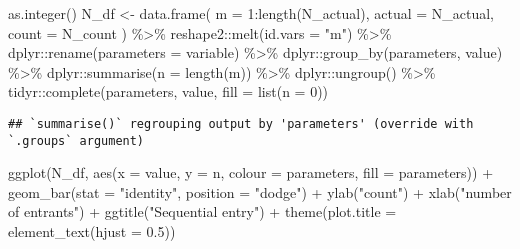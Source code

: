 \documentclass[
]{article}
\newenvironment{Shaded}{\begin{snugshade}}{\end{snugshade}}
\newcommand{\AttributeTok}[1]{\textcolor[rgb]{0.77,0.63,0.00}{#1}}
\newcommand{\DecValTok}[1]{\textcolor[rgb]{0.00,0.00,0.81}{#1}}
\newcommand{\FloatTok}[1]{\textcolor[rgb]{0.00,0.00,0.81}{#1}}
\newcommand{\FunctionTok}[1]{\textcolor[rgb]{0.00,0.00,0.00}{#1}}
\newcommand{\NormalTok}[1]{#1}
\newcommand{\OtherTok}[1]{\textcolor[rgb]{0.56,0.35,0.01}{#1}}
\newcommand{\SpecialCharTok}[1]{\textcolor[rgb]{0.00,0.00,0.00}{#1}}
\newcommand{\StringTok}[1]{\textcolor[rgb]{0.31,0.60,0.02}{#1}}
\begin{document}
\begin{Shaded}
\begin{Highlighting}[]
  \FunctionTok{as.integer}\NormalTok{()}
\NormalTok{N\_df }\OtherTok{\textless{}{-}} \FunctionTok{data.frame}\NormalTok{(}
  \AttributeTok{m =} \DecValTok{1}\SpecialCharTok{:}\FunctionTok{length}\NormalTok{(N\_actual),}
  \AttributeTok{actual =}\NormalTok{ N\_actual,}
  \AttributeTok{count =}\NormalTok{ N\_count}
\NormalTok{) }\SpecialCharTok{\%\textgreater{}\%}
\NormalTok{  reshape2}\SpecialCharTok{::}\FunctionTok{melt}\NormalTok{(}\AttributeTok{id.vars =} \StringTok{"m"}\NormalTok{) }\SpecialCharTok{\%\textgreater{}\%}
\NormalTok{  dplyr}\SpecialCharTok{::}\FunctionTok{rename}\NormalTok{(}\AttributeTok{parameters =}\NormalTok{ variable) }\SpecialCharTok{\%\textgreater{}\%}
\NormalTok{  dplyr}\SpecialCharTok{::}\FunctionTok{group\_by}\NormalTok{(parameters, value) }\SpecialCharTok{\%\textgreater{}\%}
\NormalTok{  dplyr}\SpecialCharTok{::}\FunctionTok{summarise}\NormalTok{(}\AttributeTok{n =} \FunctionTok{length}\NormalTok{(m)) }\SpecialCharTok{\%\textgreater{}\%}
\NormalTok{  dplyr}\SpecialCharTok{::}\FunctionTok{ungroup}\NormalTok{() }\SpecialCharTok{\%\textgreater{}\%}
\NormalTok{  tidyr}\SpecialCharTok{::}\FunctionTok{complete}\NormalTok{(parameters, value, }\AttributeTok{fill =} \FunctionTok{list}\NormalTok{(}\AttributeTok{n =} \DecValTok{0}\NormalTok{))}
\end{Highlighting}
\end{Shaded}

\begin{verbatim}
## `summarise()` regrouping output by 'parameters' (override with `.groups` argument)
\end{verbatim}

\begin{Shaded}
\begin{Highlighting}[]
\FunctionTok{ggplot}\NormalTok{(N\_df, }\FunctionTok{aes}\NormalTok{(}\AttributeTok{x =}\NormalTok{ value, }\AttributeTok{y =}\NormalTok{ n, }\AttributeTok{colour =}\NormalTok{ parameters, }\AttributeTok{fill =}\NormalTok{ parameters)) }\SpecialCharTok{+}
  \FunctionTok{geom\_bar}\NormalTok{(}\AttributeTok{stat =} \StringTok{"identity"}\NormalTok{, }\AttributeTok{position =} \StringTok{"dodge"}\NormalTok{) }\SpecialCharTok{+}
  \FunctionTok{ylab}\NormalTok{(}\StringTok{"count"}\NormalTok{) }\SpecialCharTok{+} \FunctionTok{xlab}\NormalTok{(}\StringTok{"number of entrants"}\NormalTok{) }\SpecialCharTok{+} \FunctionTok{ggtitle}\NormalTok{(}\StringTok{"Sequential entry"}\NormalTok{) }\SpecialCharTok{+}
  \FunctionTok{theme}\NormalTok{(}\AttributeTok{plot.title =} \FunctionTok{element\_text}\NormalTok{(}\AttributeTok{hjust =} \FloatTok{0.5}\NormalTok{))}
\end{Highlighting}
\end{Shaded}
\end{document}
